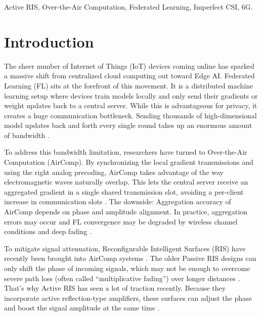 \documentclass[journal, twocolumn]{IEEEtran}
\begin{document}
\begin{IEEEkeywords}
Active RIS, Over-the-Air Computation, Federated Learning, Imperfect CSI, 6G.
\end{IEEEkeywords}

\section{Introduction}

The sheer number of Internet of Things (IoT) devices coming online has sparked a massive shift from centralized cloud computing out toward Edge AI. Federated Learning (FL) sits at the forefront of this movement. It is a distributed machine learning setup where devices train models locally and only send their gradients or weight updates back to a central server. While this is advantageous for privacy, it creates a huge communication bottleneck. Sending thousands of high-dimensional model updates back and forth every single round takes up an enormous amount of bandwidth \cite{lim2020federated, wang2019adaptive}.

To address this bandwidth limitation, researchers have turned to Over-the-Air Computation (AirComp). By synchronizing the local gradient transmissions and using the right analog precoding, AirComp takes advantage of the way electromagnetic waves naturally overlap. This lets the central server receive an aggregated gradient in a single shared transmission slot, avoiding a per-client increase in communication slots \cite{cao2021optimized}. The downside: Aggregation accuracy of AirComp depends on phase and amplitude alignment. In practice, aggregation errors may occur and FL convergence may be degraded by wireless channel conditions and deep fading \cite{cao2020optimized, zhu2020broadband}.

To mitigate signal attenuation, Reconfigurable Intelligent Surfaces (RIS) have recently been brought into AirComp systems \cite{ni2021integrating}. The older Passive RIS designs can only shift the phase of incoming signals, which may not be enough to overcome severe path loss (often called ``multiplicative fading'') over longer distances \cite{yang2020federated, zhi2022active}. That’s why Active RIS has seen a lot of traction recently. Because they incorporate active reflection-type amplifiers, these surfaces can adjust the phase and boost the signal amplitude at the same time \cite{long2021active, zhi2022active}.
\end{document}
